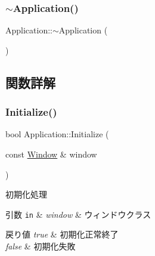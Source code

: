 \mbox{\label{class_application_a748bca84fefb9c12661cfaa2f623748d}} 
\subsubsection{\texorpdfstring{$\sim$\+Application()}{~Application()}}
{\footnotesize\ttfamily Application\+::$\sim$\+Application (\begin{DoxyParamCaption}{ }\end{DoxyParamCaption})}



\subsection{関数詳解}
\mbox{\label{class_application_a4b5480da6d4e414f1b32cf2a40ab457a}} 
\subsubsection{\texorpdfstring{Initialize()}{Initialize()}}
{\footnotesize\ttfamily bool Application\+::\+Initialize (\begin{DoxyParamCaption}\item[{const \mbox{\hyperlink{class_window}{Window}} \&}]{window }\end{DoxyParamCaption})}



初期化処理 


\begin{DoxyParams}[1]{引数}
\mbox{\tt in}  & {\em window} & ウィンドウクラス \\
\hline
\end{DoxyParams}

\begin{DoxyRetVals}{戻り値}
{\em true} & 初期化正常終了 \\
\hline
{\em false} & 初期化失敗 \\
\hline
\end{DoxyRetVals}
\mbox{\label{class_application_a6f40ffdb97f3a938ae19ea4eae4882ed}} 
